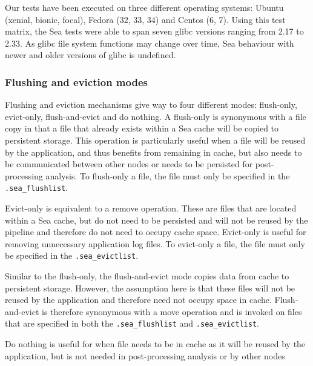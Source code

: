 Our tests have been executed on three different operating systems: Ubuntu (xenial, bionic, focal),
Fedora (32, 33, 34) and Centos (6, 7). Using this test matrix, the Sea tests were able to span seven glibc
versions ranging from 2.17 to 2.33. As glibc file system functions may change over time, Sea behaviour with
newer and older versions of glibc is undefined. 



\subsubsection{Flushing and eviction modes}
Flushing and eviction mechanisms give way to four different modes: flush-only,
evict-only, flush-and-evict and do nothing. A flush-only is synonymous with a
file copy in that a file that already exists within a Sea cache will be copied
to persistent storage. This operation is particularly useful when a file will be
reused by the application, and thus benefits from remaining in cache, but also
needs to be communicated between other nodes or needs to be persisted for
post-processing analysis. To flush-only a file, the file must only be specified
in the \texttt{.sea\_flushlist}.

Evict-only is equivalent to a remove operation. These are files that are located
within a Sea cache, but do not need to be persisted and will not be reused by
the pipeline and therefore do not need to occupy cache space. Evict-only is
useful for removing unnecessary application log files. To evict-only a file, the
file must only be specified in the \texttt{.sea\_evictlist}.

Similar to the flush-only, the flush-and-evict mode copies data from cache to
persistent storage. However, the assumption here is that these files will not be
reused by the application and therefore need not occupy space in cache.
Flush-and-evict is therefore synonymous with a move operation and is invoked on
files that are specified in both the \texttt{.sea\_flushlist} and
\texttt{.sea\_evictlist}.


Do nothing is useful for when file needs to be in cache as it will be reused by
the application, but is not needed in post-processing analysis or by other nodes

